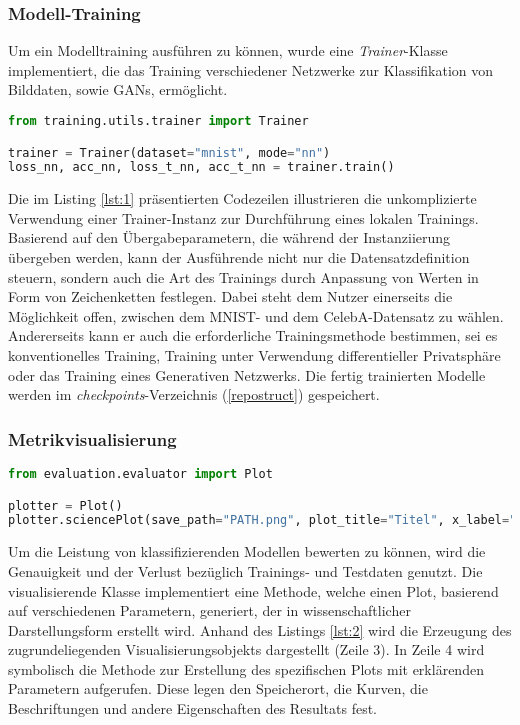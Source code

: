 \subsubsection{Modell-Training}
Um ein Modelltraining ausführen zu können, wurde eine \textit{Trainer}-Klasse implementiert, die das Training verschiedener Netzwerke zur Klassifikation von Bilddaten, sowie GANs, ermöglicht.
\begin{lstlisting}[language=Python, caption=Training eines neuronalen Netzwerks, label=lst:1]
from training.utils.trainer import Trainer 

trainer = Trainer(dataset="mnist", mode="nn")
loss_nn, acc_nn, loss_t_nn, acc_t_nn = trainer.train()
\end{lstlisting}
Die im Listing \ref{lst:1} präsentierten Codezeilen illustrieren die unkomplizierte Verwendung einer Trainer-Instanz zur Durchführung eines lokalen Trainings. Basierend auf den Übergabeparametern, die während der Instanziierung übergeben werden, kann der Ausführende nicht nur die Datensatzdefinition steuern, sondern auch die Art des Trainings durch Anpassung von Werten in Form von Zeichenketten festlegen. Dabei steht dem Nutzer einerseits die Möglichkeit offen, zwischen dem MNIST- und dem CelebA-Datensatz zu wählen. Andererseits kann er auch die erforderliche Trainingsmethode bestimmen, sei es konventionelles Training, Training unter Verwendung differentieller Privatsphäre oder das Training eines Generativen Netzwerks. Die fertig trainierten Modelle werden im \textit{checkpoints}-Verzeichnis (\ref{repostruct}) gespeichert. 

\subsubsection{Metrikvisualisierung}

\begin{lstlisting}[language=Python, caption=Plot erstellen, label=lst:2]
from evaluation.evaluator import Plot

plotter = Plot()
plotter.sciencePlot(save_path="PATH.png", plot_title="Titel", x_label="X-Achsen-Beschriftung", y_label="Y-Achsen-Beschriftung", graphs=list(), x_limit=[von,bis], y_limit=[von,bis])
\end{lstlisting}
Um die Leistung von klassifizierenden Modellen bewerten zu können, wird die Genauigkeit und der Verlust bezüglich Trainings- und Testdaten genutzt. Die visualisierende Klasse implementiert eine Methode, welche einen Plot, basierend auf verschiedenen Parametern, generiert, der in wissenschaftlicher Darstellungsform erstellt wird. Anhand des Listings \ref{lst:2} wird die Erzeugung des zugrundeliegenden Visualisierungsobjekts dargestellt (Zeile 3). In Zeile 4 wird symbolisch die Methode zur Erstellung des spezifischen Plots mit \glqq erklärenden\grqq{} Parametern aufgerufen. Diese legen den Speicherort, die Kurven, die Beschriftungen und andere Eigenschaften des Resultats fest. 


